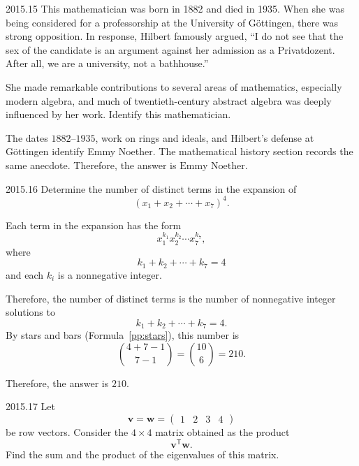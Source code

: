     \begin{pastproblem}{2015.15}
        This mathematician was born in 1882 and died in 1935. When she was being considered for a
        professorship at the University of Göttingen, there was strong opposition. In response,
        Hilbert famously argued, ``I do not see that the sex of the candidate is an argument against
        her admission as a Privatdozent. After all, we are a university, not a bathhouse.''

        She made remarkable contributions to several areas of mathematics, especially modern
        algebra, and much of twentieth-century abstract algebra was deeply influenced by her work.
        Identify this mathematician.
    \end{pastproblem}

    \begin{solution}
The dates $1882$--$1935$, work on rings and ideals, and Hilbert's
        defense at Göttingen identify Emmy Noether. The mathematical history
        section records the same anecdote.
        Therefore, the answer is $\boxed{\text{Emmy Noether}}$.
    \end{solution}

    \begin{pastproblem}{2015.16}
        Determine the number of distinct terms in the expansion of
        \[
            (x_1+x_2+\cdots+x_7)^4.
        \]
    \end{pastproblem}

    \begin{solution}
        Each term in the expansion has the form
        \[
            x_1^{k_1}x_2^{k_2}\cdots x_7^{k_7},
        \]
        where
        \[
            k_1+k_2+\cdots+k_7=4
        \]
        and each $k_i$ is a nonnegative integer.

        Therefore, the number of distinct terms is the number of nonnegative integer solutions to
        \[
            k_1+k_2+\cdots+k_7=4.
        \]
        By stars and bars (Formula~\ref{pp:stars}), this number is
        \[
            \binom{4+7-1}{7-1}
            =
            \binom{10}{6}
            =
            210.
        \]

        Therefore, the answer is $\boxed{210}$.
    \end{solution}

    \begin{pastproblem}{2015.17}
        Let
        \[
            \mathbf{v}=\mathbf{w}=
            \begin{pmatrix}
                1 & 2 & 3 & 4
            \end{pmatrix}
        \]
        be row vectors. Consider the $4\times 4$ matrix obtained as the product
        \[
            \mathbf{v}^{\mathsf T}\mathbf{w}.
        \]
        Find the sum and the product of the eigenvalues of this matrix.
    \end{pastproblem}


